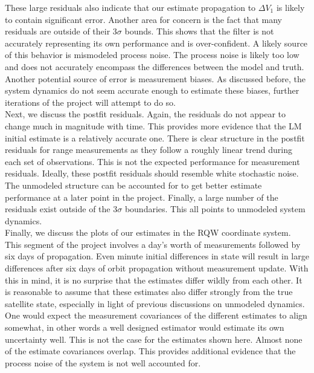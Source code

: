 \documentclass[11pt]{article}
\begin{document}
These large residuals also indicate that our estimate propagation to $\Delta V_1$ is likely to contain significant error. Another area for concern is the fact that many residuals are outside of their $3\sigma$ bounds. This shows that the filter is not accurately representing its own performance and is over-confident. A likely source of this behavior is mismodeled process noise. The process noise is likely too low and does not accurately encompass the differences between the model and truth. Another potential source of error is measurement biases. As discussed before, the system dynamics do not seem accurate enough to estimate these biases, further iterations of the project will attempt to do so. \\

Next, we discuss the postfit residuals. Again, the residuals do not appear to change much in magnitude with time. This provides more evidence that the LM initial estimate is a relatively accurate one. There is clear structure in the postfit residuals for range measurements as they follow a roughly linear trend during each set of observations. This is not the expected performance for measurement residuals. Ideally, these postfit residuals should resemble white stochastic noise. The unmodeled structure can be accounted for to get better estimate performance at a later point in the project. Finally, a large number of the residuals exist outside of the $3\sigma$ boundaries. This all points to unmodeled system dynamics. \\

Finally, we discuss the plots of our estimates in the RQW coordinate system. This segment of the project involves a day's worth of measurements followed by six days of propagation. Even minute initial differences in state will result in large differences after six days of orbit propagation without measurement update. With this in mind, it is no surprise that the estimates differ wildly from each other. It is reasonable to assume that these estimates also differ strongly from the true satellite state, especially in light of previous discussions on unmodeled dynamics. One would expect the measurement covariances of the different estimates to align somewhat, in other words a well designed estimator would estimate its own uncertainty well. This is not the case for the estimates shown here. Almost none of the estimate covariances overlap. This provides additional evidence that the process noise of the system is not well accounted for. \\
\end{document}
